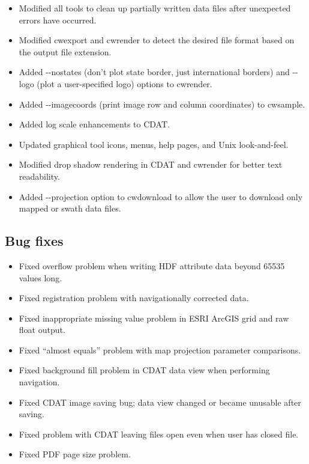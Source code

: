 \begin{itemize}
  \item Modified all tools to clean up partially written data files
  after unexpected errors have occurred.

  \item Modified cwexport and cwrender to detect the desired file
  format based on the output file extension.

  \item Added -{-}nostates (don't plot state border, just international
  borders) and -{-}logo (plot a user-specified logo) options to
  cwrender.

  \item Added -{-}imagecoords (print image row and column coordinates)
  to cwsample.

  \item Added log scale enhancements to CDAT.

  \item Updated graphical tool icons, menus, help pages, and Unix
  look-and-feel.

  \item Modified drop shadow rendering in CDAT and cwrender for better
  text readability.

  \item Added -{-}projection option to cwdownload to allow the user to
  download only mapped or swath data files.

\end{itemize}

\subsection*{Bug fixes}
\begin{itemize}

  \item Fixed overflow problem when writing HDF attribute data beyond
  65535 values long.

  \item Fixed registration problem with navigationally corrected data.

  \item Fixed inappropriate missing value problem in ESRI ArcGIS grid
  and raw float output.

  \item Fixed ``almost equals'' problem with map projection parameter
  comparisons.

  \item Fixed background fill problem in CDAT data view when
  performing navigation.

  \item Fixed CDAT image saving bug; data view changed or became
  unusable after saving.

  \item Fixed problem with CDAT leaving files open even when user has
  closed file.

  \item Fixed PDF page size problem.

\end{itemize}


